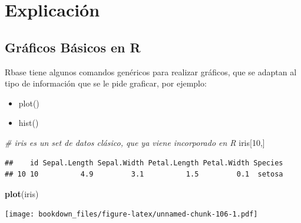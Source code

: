 \documentclass[]{book}
\newenvironment{Shaded}{\begin{snugshade}}{\end{snugshade}}
\newcommand{\CommentTok}[1]{\textcolor[rgb]{0.56,0.35,0.01}{\textit{#1}}}
\newcommand{\DataTypeTok}[1]{\textcolor[rgb]{0.13,0.29,0.53}{#1}}
\newcommand{\DecValTok}[1]{\textcolor[rgb]{0.00,0.00,0.81}{#1}}
\newcommand{\KeywordTok}[1]{\textcolor[rgb]{0.13,0.29,0.53}{\textbf{#1}}}
\newcommand{\NormalTok}[1]{#1}
\newcommand{\OperatorTok}[1]{\textcolor[rgb]{0.81,0.36,0.00}{\textbf{#1}}}
\newcommand{\StringTok}[1]{\textcolor[rgb]{0.31,0.60,0.02}{#1}}
\providecommand{\tightlist}{%
  \setlength{\itemsep}{0pt}\setlength{\parskip}{0pt}}
\begin{document}
\hypertarget{explicacion-3}{%
\section{Explicación}\label{explicacion-3}}

\hypertarget{graficos-basicos-en-r}{%
\subsection{Gráficos Básicos en R}\label{graficos-basicos-en-r}}

Rbase tiene algunos comandos genéricos para realizar gráficos, que se adaptan al tipo de información que se le pide graficar, por ejemplo:

\begin{itemize}
\tightlist
\item
  plot()
\item
  hist()
\end{itemize}

\begin{Shaded}
\begin{Highlighting}[]
\CommentTok{# iris es un set de datos clásico, que ya viene incorporado en R}
\NormalTok{iris[}\DecValTok{10}\NormalTok{,]}
\end{Highlighting}
\end{Shaded}

\begin{verbatim}
##    id Sepal.Length Sepal.Width Petal.Length Petal.Width Species
## 10 10          4.9         3.1          1.5         0.1  setosa
\end{verbatim}

\begin{Shaded}
\begin{Highlighting}[]
\KeywordTok{plot}\NormalTok{(iris)}
\end{Highlighting}
\end{Shaded}

\texttt{[image: bookdown\_files/figure-latex/unnamed-chunk-106-1.pdf]}

\begin{Shaded}
\end{Shaded}
\end{document}
